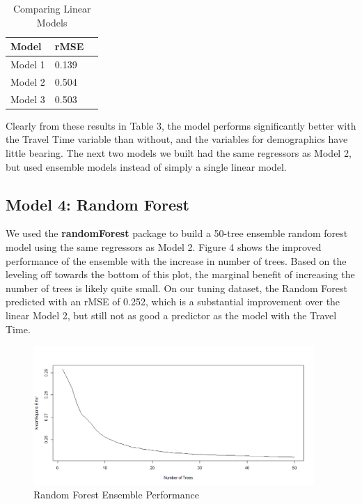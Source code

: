 \documentclass[twoside,11pt]{article}
\begin{document}
\begin{table}[H]
\centering
\begin{tabular}{lll}
  \hline
Model & rMSE \\ 
  \hline
Model 1 & 0.139 \\ 
Model 2 & 0.504 \\ 
Model 3 & 0.503 \\ 
   \hline
\end{tabular}
\caption{Comparing Linear Models} 
\end{table}

Clearly from these results in Table 3, the model performs significantly better with the Travel Time variable than without, and the variables for demographics have little bearing. The next two models we built had the same regressors as Model 2, but used ensemble models instead of simply a single linear model.

\subsection{Model 4: Random Forest}
We used the \textbf{randomForest}  package to build a 50-tree  ensemble random forest model using the same regressors as Model 2. Figure 4 shows the improved performance of the ensemble with the increase in number of trees. Based on the leveling off  towards the bottom of this plot, the marginal benefit of increasing the number of trees is likely quite small. On our tuning dataset, the  Random Forest predicted with an rMSE of 0.252, which is a substantial improvement over the linear Model 2, but still not as good a predictor as the model with the Travel Time.

\begin{figure}
    \centering
    \includegraphics[width = 0.95\textwidth]{randfor.png}
    \caption{Random Forest Ensemble Performance}
\end{figure}
\end{document}
